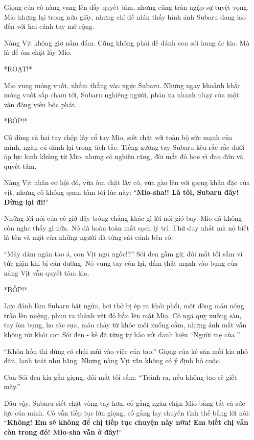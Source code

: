 \documentclass[../main.tex]{subfiles}
\begin{document}
Giọng của cô nàng vang lên đầy quyết tâm, nhưng cũng tràn ngập sự tuyệt vọng. Mio khựng lại trong nửa giây, nhưng chỉ để nhìn thấy hình ảnh Subaru đang lao đến với hai cánh tay mở rộng.

Nàng Vịt không giơ nắm đấm. Cũng không phải để đánh con sói hung ác kia. Mà là để ôm chặt lấy Mio.

*ROẠT!*

Mio vung móng vuốt, nhắm thẳng vào ngực Subaru. Nhưng ngay khoảnh khắc móng vuốt sắp chạm tới, Subaru nghiêng người, phản xạ nhanh nhạy của một vận động viên bộc phát.

*BỘP!*

Cô dùng cả hai tay chộp lấy cổ tay Mio, siết chặt với toàn bộ sức mạnh của mình, ngăn cú đánh lại trong tích tắc. Tiếng xương tay Subaru kêu rắc rắc dưới áp lực kinh khủng từ Mio, nhưng cô nghiến răng, đôi mắt đỏ hoe vì đau đớn và quyết tâm.

Nàng Vịt nhân cơ hội đó, vừa ôm chặt lấy cô, vừa gào lên với giọng khản đặc của vịt, nhưng cô không quan tâm tới lúc này: ``\textbf{Mio-sha!! Là tôi, Subaru đây! Dừng lại đi!}''

Những lời nói của cô giờ đây trông chẳng khác gì lời nói gió bay. Mio đã không còn nghe thấy gì nữa. Nó đã hoàn toàn mất sạch lý trí. Thứ duy nhất mà nó biết là tên và mặt của những người đã từng sát cánh bên cô.

``Mày dám ngăn tao á, con Vịt ngu ngốc!?'' Sói đen gầm gừ, đôi mắt tối sầm vì tức giận khi bị cản đường. Nó vung tay còn lại, đấm thật mạnh vào bụng của nàng Vịt vẫn quyết tâm kia.

*BỐP!*

Lực đánh làm Subaru bật ngửa, hơi thở bị ép ra khỏi phổi, một dòng máu nóng trào lên miệng, phun ra thành vệt đỏ bắn lên mặt Mio. Cô ngã quỵ xuống sàn, tay ôm bụng, ho sặc sụa, máu chảy từ khóe môi xuống cằm, nhưng ánh mắt vẫn không rời khỏi con Sói đen - kẻ đã từng tự hào với danh hiệu ``Người mẹ của \hll''.

``Khôn hồn thì đừng có chúi mũi vào việc của tao.'' Giọng của kẻ săn mồi kia nhỏ dần, lạnh toát như băng. Nhưng nàng Vịt vẫn không có ý định bỏ cuộc.

Con Sói đen kia gằn giọng, đôi mắt tối sầm: ``Tránh ra, nếu không tao sẽ giết mày.''

Dâu vậy, Subaru siết chặt vòng tay hơn, cố gắng ngăn chặn Mio bằng tất cả sức lực của mình. Cô vẫn tiếp tục lớn giọng, cố gắng lay chuyển tình thế bằng lời nói: ``\textbf{Không! Em sẽ không để chị tiếp tục chuyện này nữa! Em biết chị vẫn còn trong đó! Mio-sha vẫn ở đây!}''
\end{document}
